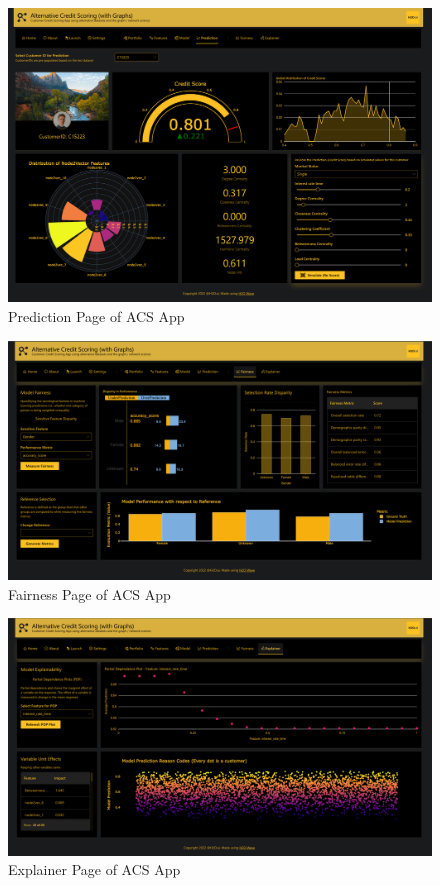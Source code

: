 \documentclass[12pt,a4paper]{report}
\begin{document}
\begin{figure}[H]
\centering
\includegraphics[width=1\textwidth]{a5.png}
\caption{Prediction Page of ACS App}
\end{figure}

\begin{figure}[H]
\centering
\includegraphics[width=1\textwidth]{a6.png}
\caption{Fairness Page of ACS App}
\end{figure}

\begin{figure}[H]
\centering
\includegraphics[width=1\textwidth]{a7.png}
\caption{Explainer Page of ACS App}
\end{figure}
\end{document}
